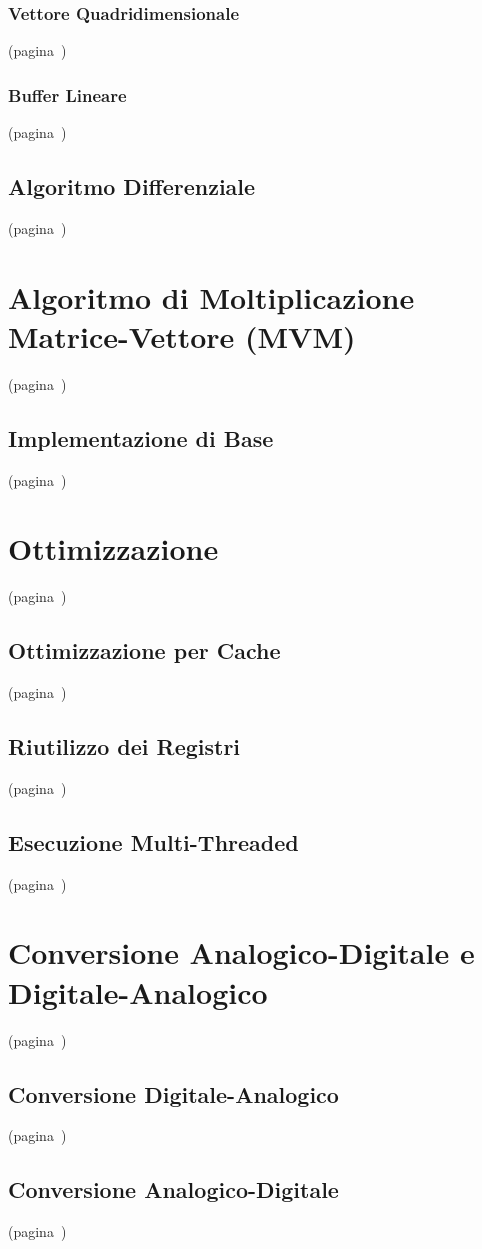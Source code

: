 \subsubsection{Vettore Quadridimensionale}(pagina~\pageref{sec:4d_array})
\subsubsection{Buffer Lineare}(pagina~\pageref{sec:flat_buf})
\subsection{Algoritmo Differenziale}(pagina~\pageref{sec:diff_algo})
\section{Algoritmo di Moltiplicazione Matrice-Vettore (MVM)}(pagina~\pageref{sec:mvm_algo})
\subsection{Implementazione di Base}(pagina~\pageref{sec:std_imp})
\section{Ottimizzazione}(pagina~\pageref{sec:optim})
\subsection{Ottimizzazione per Cache}(pagina~\pageref{sec:cache_friendly})
\subsection{Riutilizzo dei Registri}(pagina~\pageref{sec:reg_reuse})
\subsection{Esecuzione Multi-Threaded}(pagina~\pageref{sec:multithread})
\section{Conversione Analogico-Digitale e Digitale-Analogico}(pagina~\pageref{sec:mod_gvsoc})
\subsection{Conversione Digitale-Analogico}(pagina~\pageref{sec:dac})
\subsection{Conversione Analogico-Digitale}(pagina~\pageref{sec:adc})
